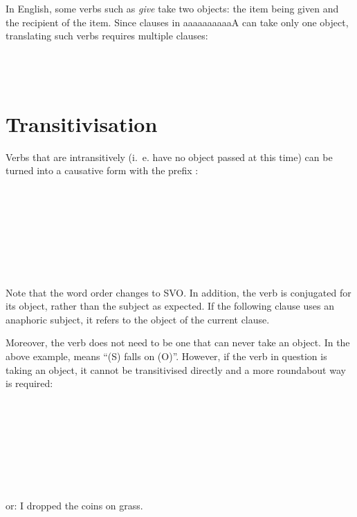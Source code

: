 \documentclass{book}
\newcommand{\lname}{aaaaaaaaaaA}
\begin{document}
In English, some verbs such as \emph{give} take two objects: the item being given and the recipient of the item. Since clauses in \lname{} can take only one object, translating such verbs requires multiple clauses: \\
~\\
 \\
     \\
   

\section{Transitivisation}

Verbs that are intransitively (i.~e. have no object passed at this time) can be turned into a causative form with the prefix : \\
~\\
 \\
  \\
  \\
~\\
 \\
   \\
   \\

Note that the word order changes to SVO. In addition, the verb is conjugated for its object, rather than the subject as expected. If the following clause uses an anaphoric subject, it refers to the object of the current clause.

Moreover, the verb does not need to be one that can never take an object. In the above example,  means ``(S) falls on (O)''. However, if the verb in question is taking an object, it cannot be transitivised directly and a more roundabout way is required: \\
~\\
 \\
   \\
   \\
~\\
 \\
     \\
     \\
or: I dropped the coins on grass.
\end{document}
